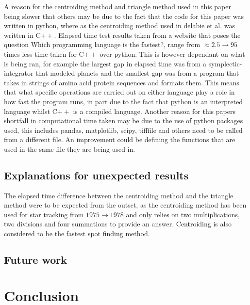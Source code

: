 \documentclass[aps,pra,a4paper,nofootinbib,onecolumn,tightenlines,longbibliography,12pt,amsfonts,amssymb,amsmath,floatfix]{revtex4-2} %
\begin{document}
  A reason for the centroiding method and triangle method used in this paper being slower that others may 
  be due to the fact that the code for this paper was written in python, where as the centroiding method used in 
  delabie et al. was written in C$++$. Elapsed time test results taken from a website that poses the question 
  Which programming language is the fastest?\cite{bagley}, range from $\approx 2.5\rightarrow 95$ times 
  less time taken for C$++$ over python. This is however dependant on what is being ran, for example the largest 
  gap in elapsed time was from a symplectic-integrator that modeled planets and the smallest gap was from a program 
  that takes in strings of amino acid protein sequences and formats them. This means that what specific operations 
  are carried out on either language play a role in how fast the program runs, in part due to the fact that 
  python is an interpreted language whilst C$++$ is a compiled language.
  Another reason for this papers shortfall in computational time taken may be due to the use of python 
  packages used, this includes pandas, matplotlib, scipy, tifffile and others need to be called from 
  a different file. An improvement could be defining the functions that are used in the same file they are 
  being used in.


  \subsection{Explanations for unexpected results} %
  \label{sub:Explanations for unexpected results}
  
  The elapsed time difference between the centroiding method and the triangle method were to be expected 
  from the outset, as the centroiding method has been used for star tracking from $1975 \rightarrow 1978$ and only 
  relies on two multiplications, two divisions and four summations to provide an answer. Centroiding is also 
  considered to be the fastest spot finding method.\cite{delabie2014accurate}

  \subsection{Future work} %
  \label{sub:Discuss improvement}
  
  


\section{Conclusion} %
\label{sec:Conclusion}
\end{document}
